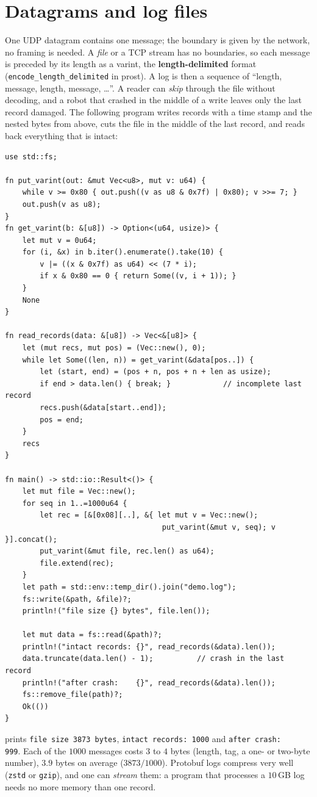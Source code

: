 \section*{Datagrams and log files}
One UDP datagram contains one message; the boundary is given by the network, no framing is needed. A \emph{file} or a TCP stream has no boundaries, so each message is preceded by its length as a varint, the \textbf{length-delimited} format (\verb!encode_length_delimited! in prost). A log is then a sequence of ``length, message, length, message, \dots''. A reader can \emph{skip} through the file without decoding, and a robot that crashed in the middle of a write leaves only the last record damaged. The following program writes records with a time stamp and the nested bytes from above, cuts the file in the middle of the last record, and reads back everything that is intact:
\begin{verbatim}
use std::fs;

fn put_varint(out: &mut Vec<u8>, mut v: u64) {
    while v >= 0x80 { out.push((v as u8 & 0x7f) | 0x80); v >>= 7; }
    out.push(v as u8);
}
fn get_varint(b: &[u8]) -> Option<(u64, usize)> {
    let mut v = 0u64;
    for (i, &x) in b.iter().enumerate().take(10) {
        v |= ((x & 0x7f) as u64) << (7 * i);
        if x & 0x80 == 0 { return Some((v, i + 1)); }
    }
    None
}

fn read_records(data: &[u8]) -> Vec<&[u8]> {
    let (mut recs, mut pos) = (Vec::new(), 0);
    while let Some((len, n)) = get_varint(&data[pos..]) {
        let (start, end) = (pos + n, pos + n + len as usize);
        if end > data.len() { break; }            // incomplete last record
        recs.push(&data[start..end]);
        pos = end;
    }
    recs
}

fn main() -> std::io::Result<()> {
    let mut file = Vec::new();
    for seq in 1..=1000u64 {
        let rec = [&[0x08][..], &{ let mut v = Vec::new();
                                    put_varint(&mut v, seq); v }].concat();
        put_varint(&mut file, rec.len() as u64);
        file.extend(rec);
    }
    let path = std::env::temp_dir().join("demo.log");
    fs::write(&path, &file)?;
    println!("file size {} bytes", file.len());

    let mut data = fs::read(&path)?;
    println!("intact records: {}", read_records(&data).len());
    data.truncate(data.len() - 1);          // crash in the last record
    println!("after crash:    {}", read_records(&data).len());
    fs::remove_file(path)?;
    Ok(())
}
\end{verbatim}
prints \verb!file size 3873 bytes!, \verb!intact records: 1000! and \verb!after crash:    999!. Each of the $1000$ messages costs $3$ to $4$ bytes (length, tag, a one- or two-byte number), $3.9$ bytes on average ($3873/1000$). Protobuf logs compress very well (\verb!zstd! or \verb!gzip!), and one can \emph{stream} them: a program that processes a $10$\,GB log needs no more memory than one record.

